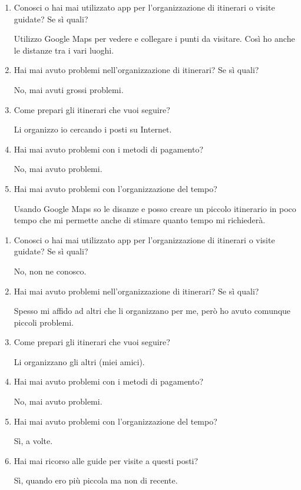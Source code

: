 \clearpage
{}

\begin{enumerate}

\item Conosci o hai mai utilizzato app per l'organizzazione di itinerari o visite guidate? Se sì quali?

Utilizzo Google Maps per vedere e collegare i punti da visitare. Così ho anche le distanze tra i vari luoghi.

\item Hai mai avuto problemi nell'organizzazione di itinerari? Se sì quali?

No, mai avuti grossi problemi.

\item Come prepari gli itinerari che vuoi seguire?

Li organizzo io cercando i posti su Internet.

\item Hai mai avuto problemi con i metodi di pagamento?

No, mai avuto problemi.

\item Hai mai avuto problemi con l'organizzazione del tempo?

Usando Google Maps so le disanze e posso creare un piccolo itinerario in poco tempo che mi permette anche di stimare quanto tempo mi richiederà.

\end{enumerate}

\clearpage
{}

\begin{enumerate}

\item Conosci o hai mai utilizzato app per l'organizzazione di itinerari o visite guidate? Se sì quali?

No, non ne conosco.

\item Hai mai avuto problemi nell'organizzazione di itinerari? Se sì quali?

Spesso mi affido ad altri che li organizzano per me, però ho avuto comunque piccoli problemi.

\item Come prepari gli itinerari che vuoi seguire?

Li organizzano gli altri (miei amici).

\item Hai mai avuto problemi con i metodi di pagamento?

No, mai avuto problemi.

\item Hai mai avuto problemi con l'organizzazione del tempo?

Sì, a volte.

\item Hai mai ricorso alle guide per visite a questi posti?

Sì, quando ero più piccola ma non di recente.

\end{enumerate}

